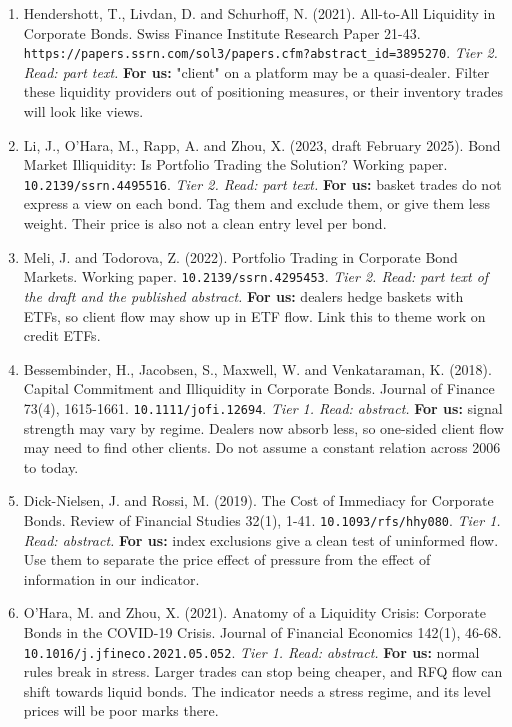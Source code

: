 \begin{enumerate}[leftmargin=*,itemsep=3pt]
\item Hendershott, T., Livdan, D. and Schurhoff, N. (2021). All-to-All Liquidity in Corporate Bonds. Swiss Finance Institute Research Paper 21-43. \nolinkurl{https://papers.ssrn.com/sol3/papers.cfm?abstract\_id=3895270}. \emph{Tier 2. Read: part text.} \textbf{For us:} "client" on a platform may be a quasi-dealer. Filter these liquidity providers out of positioning measures, or their inventory trades will look like views.
\item Li, J., O'Hara, M., Rapp, A. and Zhou, X. (2023, draft February 2025). Bond Market Illiquidity: Is Portfolio Trading the Solution? Working paper. \nolinkurl{10.2139/ssrn.4495516}. \emph{Tier 2. Read: part text.} \textbf{For us:} basket trades do not express a view on each bond. Tag them and exclude them, or give them less weight. Their price is also not a clean entry level per bond.
\item Meli, J. and Todorova, Z. (2022). Portfolio Trading in Corporate Bond Markets. Working paper. \nolinkurl{10.2139/ssrn.4295453}. \emph{Tier 2. Read: part text of the draft and the published abstract.} \textbf{For us:} dealers hedge baskets with ETFs, so client flow may show up in ETF flow. Link this to theme work on credit ETFs.
\item Bessembinder, H., Jacobsen, S., Maxwell, W. and Venkataraman, K. (2018). Capital Commitment and Illiquidity in Corporate Bonds. Journal of Finance 73(4), 1615-1661. \nolinkurl{10.1111/jofi.12694}. \emph{Tier 1. Read: abstract.} \textbf{For us:} signal strength may vary by regime. Dealers now absorb less, so one-sided client flow may need to find other clients. Do not assume a constant relation across 2006 to today.
\item Dick-Nielsen, J. and Rossi, M. (2019). The Cost of Immediacy for Corporate Bonds. Review of Financial Studies 32(1), 1-41. \nolinkurl{10.1093/rfs/hhy080}. \emph{Tier 1. Read: abstract.} \textbf{For us:} index exclusions give a clean test of uninformed flow. Use them to separate the price effect of pressure from the effect of information in our indicator.
\item O'Hara, M. and Zhou, X. (2021). Anatomy of a Liquidity Crisis: Corporate Bonds in the COVID-19 Crisis. Journal of Financial Economics 142(1), 46-68. \nolinkurl{10.1016/j.jfineco.2021.05.052}. \emph{Tier 1. Read: abstract.} \textbf{For us:} normal rules break in stress. Larger trades can stop being cheaper, and RFQ flow can shift towards liquid bonds. The indicator needs a stress regime, and its level prices will be poor marks there.

\end{enumerate}
